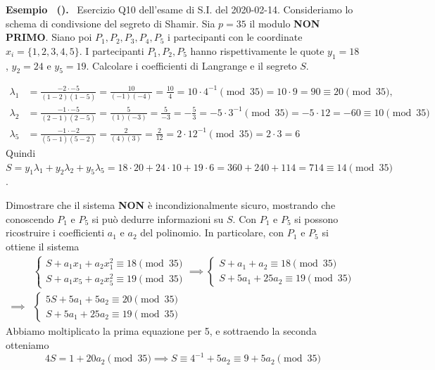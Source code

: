 \documentclass[a4paper, 11pt]{article}
\newenvironment{example}[1][]{
  \par\noindent\textbf{Esempio%
  \if\relax\detokenize{#1}\relax\else\ (\textbf{#1})\fi.}\ }{}
\begin{document}
\begin{example}
    Esercizio Q10 dell'esame di S.I. del 2020-02-14. Consideriamo lo schema di condivsione del segreto di Shamir. Sia $p = 35$ il modulo \textbf{NON PRIMO}. Siano poi $P_1, P_2, P_3, P_4, P_5$ i partecipanti con le coordinate $x_i = \{1, 2, 3, 4, 5\}$. I partecipanti $P_1, P_2, P_5$ hanno rispettivamente le quote $y_1 = 18$, $y_2 = 24$ e $y_5 = 19$. Calcolare i coefficienti di Langrange e il segreto $S$.

    \begin{align*} 
        \lambda_1 &= \frac{-2 \cdot -5}{(1-2)(1-5)} = \frac{10}{(-1)(-4)} = \frac{10}{4} = 10 \cdot 4^{-1} \pmod {35} = 10 \cdot 9 = 90 \equiv 20 \pmod{35}, \qquad \\
        \lambda_2 &= \frac{-1 \cdot -5}{(2-1)(2-5)} = \frac{5}{(1)(-3)} = \frac{5}{-3} = -\frac{5}{3} = -5 \cdot 3^{-1} \pmod{35} = -5 \cdot 12 = -60 \equiv 10 \pmod{35}\\
        \lambda_5 &= \frac{-1 \cdot -2}{(5-1)(5-2)} = \frac{2}{(4)(3)} = \frac{2}{12} = 2 \cdot 12^{-1} \pmod{35} = 2 \cdot 3 = 6
    \end{align*}
    Quindi $S = y_1\lambda_1 + y_2\lambda_2 + y_5\lambda_5 = 18\cdot 20 + 24\cdot 10 + 19\cdot 6 = 360 + 240 + 114 = 714 \equiv 14 \pmod{35}$.

    Dimostrare che il sistema \textbf{NON} è incondizionalmente sicuro, mostrando che conoscendo $P_1$ e $P_5$ si può dedurre informazioni su $S$.
    Con $P_1$ e $P_5$ si possono ricostruire i coefficienti $a_1$ e $a_2$ del polinomio. In particolare, con $P_1$ e $P_5$ si ottiene il sistema
    \[
        \begin{aligned}
            &\begin{cases}
                S + a_1x_1 + a_2x_1^2 \equiv 18 \pmod{35} \\
                S + a_1x_5 + a_2x_5^2 \equiv 19 \pmod{35}
            \end{cases}
            \implies 
            \begin{cases}
                S + a_1 + a_2 \equiv 18 \pmod{35} \\
                S + 5a_1 + 25a_2 \equiv 19 \pmod{35}
            \end{cases} \\
            \implies
            &\begin{cases}
                5S + 5a_1 + 5a_2 \equiv 20 \pmod{35} \\
                S + 5a_1 + 25a_2 \equiv 19 \pmod{35}
            \end{cases}
        \end{aligned}
    \]
    Abbiamo moltiplicato la prima equazione per 5, e sottraendo la seconda otteniamo
    \[
        4S = 1 + 20a_2 \pmod{35} \implies S \equiv 4^{-1} + 5a_2 \equiv 9 + 5a_2 \pmod{35}
    \]


\end{example}
\end{document}
